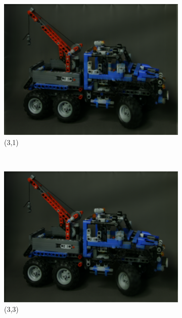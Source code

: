 \documentclass[11pt,a4paper,titlepage]{article}
\begin{document}
\begin{figure}
\begin{subfigure}[t]{0.31\textwidth}
		\includegraphics[width=\textwidth]{results/tiles_legotruck_6x6x480x640_480x640x5_tiling_4x6x200x200_overlap_0.5/Reconstruction_of_view_(3,1).png}
		\caption{(3,1)}
	\end{subfigure}%
	~
	\begin{subfigure}[t]{0.31\textwidth}
		\includegraphics[width=\textwidth]{results/tiles_legotruck_6x6x480x640_480x640x5_tiling_4x6x200x200_overlap_0.5/Reconstruction_of_view_(3,3).png}
		\caption{(3,3)}
	\end{subfigure}%
	~
	\begin{subfigure}[t]{0.31\textwidth}

\end{subfigure}
\end{figure}
\end{document}
